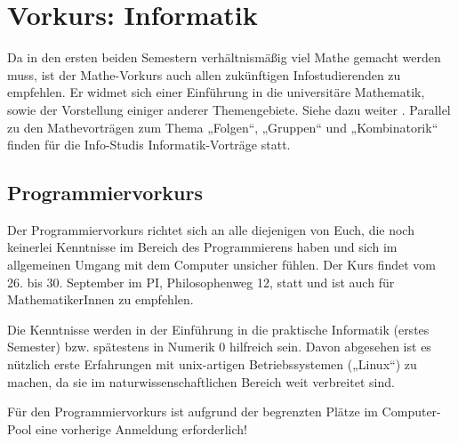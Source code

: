 \section{Vorkurs: Informatik}
\label{vkinfo}
Da in den ersten beiden Semestern verhältnismäßig viel Mathe gemacht werden muss, ist der Mathe-Vorkurs auch allen zukünftigen Infostudierenden zu empfehlen. Er widmet sich einer Einführung in die universitäre Mathematik, sowie der Vorstellung einiger anderer Themengebiete. Siehe dazu weiter
.
Parallel zu den Mathevorträgen zum Thema „Folgen“, „Gruppen“ und „Kombinatorik“ finden für die Info-Studis Informatik-Vorträge statt.

\parskip

\subsection{Programmiervorkurs}
Der Programmiervorkurs richtet sich an alle diejenigen von Euch, die noch keinerlei Kenntnisse im Bereich des Programmierens haben und sich im allgemeinen Umgang mit dem Computer unsicher fühlen. Der Kurs findet vom 26. bis 30. September im \gls{PI}, Philosophenweg 12, statt und ist auch für MathematikerInnen zu empfehlen.

Die Kenntnisse werden in der Einführung in die praktische Informatik (erstes Semester) bzw. spätestens in Numerik 0 hilfreich sein. Davon abgesehen ist es nützlich erste Erfahrungen mit unix-artigen Betriebssystemen („Linux“) zu machen, da sie im naturwissenschaftlichen Bereich weit verbreitet sind.

Für den Programmiervorkurs ist aufgrund der begrenzten Plätze im Computer-Pool eine vorherige Anmeldung erforderlich!
